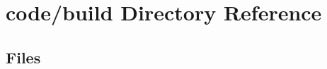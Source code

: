 \section{code/build Directory Reference}
\label{dir_7a85bb677adac0cf2f76d1fa06dbfe77}
\subsection*{Files}
\begin{DoxyCompactItemize}
\end{DoxyCompactItemize}
